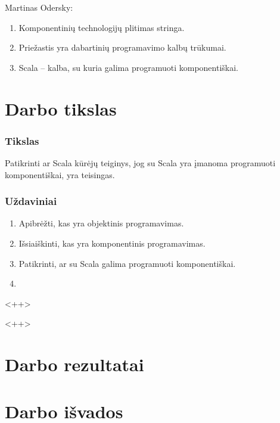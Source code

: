 \begin{frame}
  Martinas Odersky:
  \begin{enumerate}
    \item Komponentinių technologijų plitimas stringa.
    \item Priežastis yra dabartinių programavimo kalbų trūkumai.
    \item Scala – kalba, su kuria galima programuoti komponentiškai.
  \end{enumerate}
  \begin{comment}
    Martino Odersky teigimu komponentinių technologijų plitimas stringa,
    nes dabartinėse programavimo kalbose nėra realizuotos priemonės
    leidžiančios apibrėžti ir sujungti komponentus. Jo siūlomas
    sprendimas: programavimo kalba Scala, su kuria galima programuoti
    komponentiškai.
  \end{comment}
\end{frame}

\section{Darbo tikslas}


\begin{frame}
  \frametitle{Tikslas}
  Patikrinti ar Scala kūrėjų teiginys, jog su Scala yra įmanoma
  programuoti komponentiškai, yra teisingas.
\end{frame}

\begin{frame}
  \frametitle{Uždaviniai}
  \begin{enumerate}
    \item Apibrėžti, kas yra objektinis programavimas.
    \item Išsiaiškinti, kas yra komponentinis programavimas.
    \item Patikrinti, ar su Scala galima programuoti komponentiškai.
    \item 
  \end{enumerate}<++>
\end{frame}<++>

\section{Darbo rezultatai}

\section{Darbo išvados}
